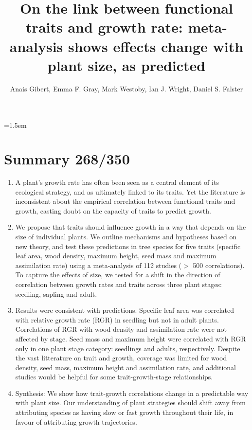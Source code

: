 \documentclass[a4paper,11pt]{article}
\title{On the link between functional traits and growth rate: meta-analysis shows effects change with plant size, as predicted}
\author{Anais Gibert\textasteriskcentered, Emma F. Gray, Mark Westoby, Ian J. Wright, Daniel S. Falster}
\affiliation{Biological Sciences, Macquarie University NSW 2109, Australia\\
\textasteriskcentered Email for correspondence: \texttt{anais.gibert@gmail.com}\\
Word count: ~5538 words (without supplementary material, Fig and ref)}
\date{}
\begin{document}
\mstitlepage
\noindent
\parindent=1.5em
\addtolength{\parskip}{.3em}
\doublespacing
\linenumbers
\section{Summary 268/350}\label{abstract}
\begin{enumerate}
\def\labelenumi{\arabic{enumi}.}
\itemsep1pt\parskip0pt
\item A plant's growth rate has often been seen as a central element of its ecological strategy, and as ultimately linked to its traits. Yet the literature is inconsistent about the empirical correlation between functional traits and growth, casting doubt on the capacity of traits to predict growth.

\item We propose that traits should influence growth in a way that depends on the size of individual plants. We outline mechanisms and hypotheses based on new theory, and test these predictions in tree species for five traits (specific leaf area, wood density, maximum height, seed mass and maximum assimilation rate) using a meta-analysis of 112 studies ($>$ 500 correlations). To capture the effects of size, we tested for a shift in the direction of correlation between growth rates and traits across three plant stages: seedling, sapling and adult.

\item Results were consistent with predictions. Specific leaf area was correlated with relative growth rate (RGR) in seedling but not in adult plants. Correlations of RGR with wood density and assimilation rate were not affected by stage. Seed mass and maximum height were correlated with RGR only in one plant stage category: seedlings and adults, respectively. Despite the vast litterature on trait and growth, coverage was limited for wood density, seed mass, maximum height and assimilation rate, and additional studies would be helpful for some trait-growth-stage relationships. 

\item Synthesis: We show how trait-growth correlations change in a predictable way with plant size. Our understanding of plant strategies should shift away from attributing species as having slow or fast growth throughout their life, in favour of attributing growth trajectories.

\end{enumerate}

\clearpage
\end{document}
